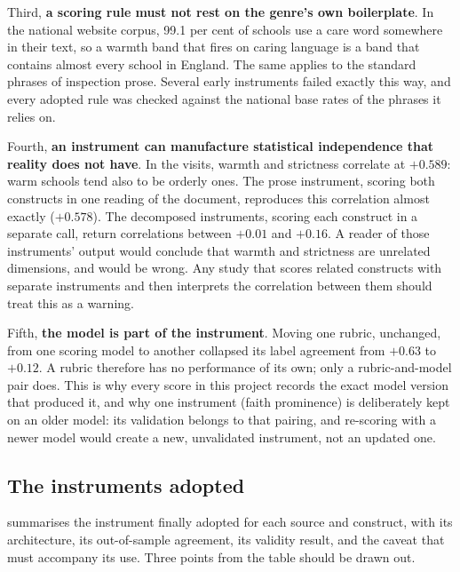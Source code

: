 Third, \textbf{a scoring rule must not rest on the genre's own
boilerplate}. In the national website corpus, 99.1 per cent of schools use
a care word somewhere in their text, so a warmth band that fires on caring
language is a band that contains almost every school in England. The same
applies to the standard phrases of inspection prose. Several early
instruments failed exactly this way, and every adopted rule was checked
against the national base rates of the phrases it relies on.

Fourth, \textbf{an instrument can manufacture statistical independence that
reality does not have}. In the visits, warmth and strictness correlate at
$+0.589$: warm schools tend also to be orderly ones. The prose instrument,
scoring both constructs in one reading of the document, reproduces this
correlation almost exactly ($+0.578$). The decomposed instruments, scoring
each construct in a separate call, return correlations between $+0.01$ and
$+0.16$. A reader of those instruments' output would conclude that warmth
and strictness are unrelated dimensions, and would be wrong. Any study that
scores related constructs with separate instruments and then interprets the
correlation between them should treat this as a warning.

Fifth, \textbf{the model is part of the instrument}. Moving one rubric,
unchanged, from one scoring model to another collapsed its label agreement
from $+0.63$ to $+0.12$. A rubric therefore has no performance of its own;
only a rubric-and-model pair does. This is why every score in this project
records the exact model version that produced it, and why one instrument
(faith prominence) is deliberately kept on an older model: its validation
belongs to that pairing, and re-scoring with a newer model would create a
new, unvalidated instrument, not an updated one.

\subsection{The instruments adopted}
\label{sec:p1_scoring_adopted}

 summarises the instrument finally adopted for
each source and construct, with its architecture, its out-of-sample
agreement, its validity result, and the caveat that must accompany its use.
Three points from the table should be drawn out.

